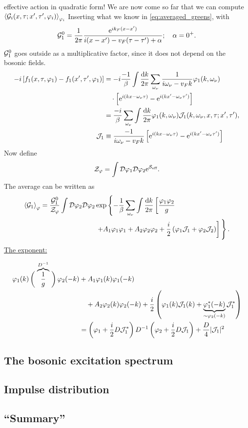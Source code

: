 effective action in quadratic form!
We are now come so far that we can compute \(\ev{\gre_i(x, \tau;x', \tau', \p_i)}_{\p_i}\)
Inserting what we know in \cref{eq:averaged_greens}, with \[\mathcal{G}_1^0 = \frac{1}{2\pi}\frac{\mathrm{e}^{ik_F(x-x')}}{i(x-x')-v_F(\tau-\tau') + \alpha} ; \quad \alpha = 0^+.\]
$\mathcal{G}_1^0$ goes outside as a multiplicative factor, since it does not depend on the bosonic fields. 
\begin{align*}
-i\left[f_1(x, \tau, \varphi_1) - f_1(x', \tau', \varphi_1)\right] &= -i\frac{-1}{\beta}\int\frac{\dd{k}}{2\pi}\sum_{\omega_\nu}\frac{1}{i\omega_\nu-v_Fk}\varphi_1(k, \omega_\nu) \\
&\quad\cdot\left[\mathrm{e}^{i(kx-\omega_\nu\tau)} - \mathrm{e}^{i(kx'-\omega_\nu\tau')}\right] \\
&=\frac{-i}{\beta}\sum_{\omega_\nu}\int\frac{\dd{k}}{2\pi}\varphi_1(k, \omega_\nu)\mathcal{J}_1(k, \omega_\nu, x, \tau;x', \tau'),\\
\mathcal{J}_1&\equiv \frac{-1}{i\omega_\nu-v_Fk} \left[\mathrm{e}^{i(kx-\omega_\nu\tau)} - \mathrm{e}^{i(kx'-\omega_\nu\tau')}\right]
\end{align*}
Now define 
\begin{equation}
\mathcal{Z}_\varphi = \int\mathcal{D}\varphi_1\mathcal{D}\varphi_2\mathrm{e}^{\mathcal{S}_{\text{eff}}}.
\end{equation}
The average can be written as
\begin{align*}
\ev{\gre_1}_\p = \frac{\gre_1^0}{\Z_\p} \int \D\p_2\D\p_2 &\exp \left\{ -\frac{1}{\beta}\sum_{\omega_\nu}\int\frac{\dd{k}}{2\pi} \left[\frac{\p_1\p_2}{g}\right.\right.\\
& \left.\left.+A_1\p_1\p_1+ A_2\p_2\p_2+ \frac{i}{2}\left(\p_1\J_1 + \p_2\J_2\right)\right]\vphantom{-\frac{1}{\beta}\sum_{\omega_\nu}\int\frac{\dd{k}}{2\pi} \left[\frac{\p_1\p_2}{g}\right. }\right\}.
\end{align*}
\underline{The exponent:}

\begin{align*}
\varphi_1(k)\left(\vphantom{\frac12}\right.\overbrace{\frac{1}{g}}^{D^{-1}}\left.\vphantom{\frac12}\right)\varphi_2(-k) &+ A_1\varphi_1(k)\varphi_1(-k) \\
&\quad + A_2\varphi_2(k)\varphi_2(-k) + \frac i2\left(\varphi_1(k)\mathcal{J}_1(k) + \underbrace{\varphi_1^*(-k)}_{\sim\varphi_2(-k)}\mathcal{J}_1^*\right) \\
&= \left(\varphi_1+\frac{i}{2}D\mathcal{J}_1^*\right)D^{-1}\left(\varphi_2+\frac{i}{2}D\mathcal{J}_1\right) + \frac{D}{4}|\mathcal{J}_1|^2
\end{align*}






\subsection{The bosonic excitation spectrum} %
\subsection{Impulse distribution} %
\subsection{``Summary''} %

